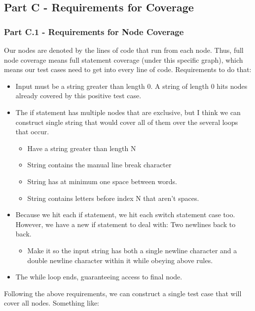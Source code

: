 \documentclass{article}
\begin{document}
\subsection*{Part C - Requirements for Coverage}

\subsubsection*{Part C.1 - Requirements for Node Coverage}

Our nodes are denoted by the lines of code that run from each node. Thus, full node coverage means full statement coverage (under this specific graph), which means our test cases need to get into every line of code. Requirements to do that:

\begin{itemize}
    \item Input must be a string greater than length 0. A string of length 0 hits nodes already covered by this positive test case.
    \item The if statement has multiple nodes that are exclusive, but I think we can construct single string that would cover all of them over the several loops that occur.
    \begin{itemize}
        \item Have a string greater than length N
        \item String contains the manual line break character
        \item String has at minimum one space between words.
        \item String contains letters before index N that aren't spaces.
    \end{itemize}
    \item Because we hit each if statement, we hit each switch statement case too. However, we have a new if statement to deal with: Two newlines back to back.
    \begin{itemize}
        \item Make it so the input string has both a single newline character and a double newline character within it while obeying above rules.
    \end{itemize}
    \item The while loop ends, guaranteeing access to final node.
\end{itemize}

Following the above requirements, we can construct a single test case that will cover all nodes. Something like:
\end{document}
